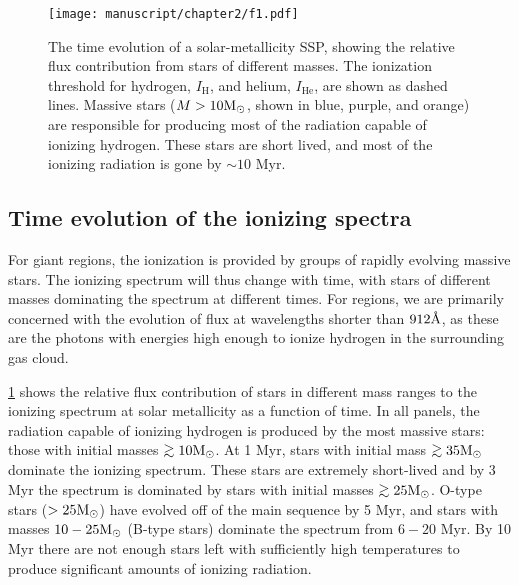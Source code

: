 \begin{figure}[!htbp]
  \begin{center}
    \texttt{[image: manuscript/chapter2/f1.pdf]}
    \caption{The time evolution of a solar-metallicity SSP, showing the relative flux contribution from stars of different masses. The ionization threshold for hydrogen, $I_{\mathrm{H}}$, and helium, $I_{\mathrm{He}}$, are shown as dashed lines. Massive stars ($M > 10\mathrm{M_{\odot}}$, shown in blue, purple, and orange) are responsible for producing most of the radiation capable of ionizing hydrogen. These stars are short lived, and most of the ionizing radiation is gone by $\sim 10$ Myr.}
    \label{fig:specPile}
  \end{center}
\end{figure}


\subsection{Time evolution of the ionizing spectra}\label{sec:spectra:age}

For giant \hii regions, the ionization is provided by groups of rapidly evolving massive stars. The ionizing spectrum will thus change with time, with stars of different masses dominating the spectrum at different times. For \hii regions, we are primarily concerned with the evolution of flux at wavelengths shorter than $912 \mbox{\AA}$, as these are the photons with energies high enough to ionize hydrogen in the surrounding gas cloud. 

\ref{fig:specPile} shows the relative flux contribution of stars in different mass ranges to the ionizing spectrum at solar metallicity as a function of time. In all panels, the radiation capable of ionizing hydrogen is produced by the most massive stars: those with initial masses $\gtrsim 10 \Msun$. At 1 Myr, stars with initial mass $\gtrsim35\Msun$ dominate the ionizing spectrum. These stars are extremely short-lived and by 3 Myr the spectrum is dominated by stars with initial masses $\gtrsim25\Msun$. O-type stars ($>25\mathrm{M_{\odot}}$) have evolved off of the main sequence by 5 Myr, and stars with masses $10-25\mathrm{M_{\odot}}$ (B-type stars) dominate the spectrum from $6-20$ Myr. By 10 Myr there are not enough stars left with sufficiently high temperatures to produce significant amounts of ionizing radiation.

